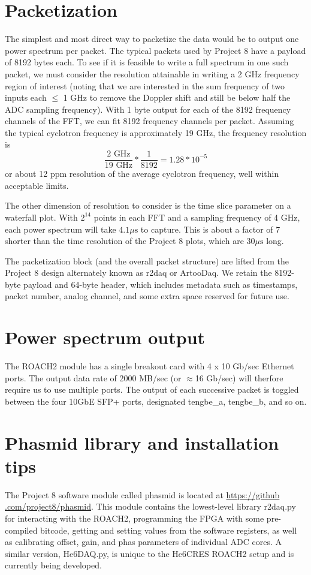 \documentclass[a4paper,10pt]{article}
\begin{document}
\section{Packetization}
The simplest and most direct way to packetize the data would be to output one power spectrum per packet. The typical packets used by Project 8 have a payload of 8192 bytes each. To see if it is feasible to write a full spectrum in one such packet, we must consider the resolution attainable in writing a 2 GHz frequency region of interest (noting that we are interested in the sum frequency of two inputs each $\leq$ 1 GHz to remove the Doppler shift and still be below half the ADC sampling frequency). With 1 byte output for each of the 8192 frequency channels of the FFT, we can fit 8192 frequency channels per packet. Assuming the typical cyclotron frequency is approximately 19 GHz, the frequency resolution is 
\begin{equation}
\frac{2 \text{ GHz}}{19 \text{ GHz}}*\frac{1}{8192} =   1.28*10^{-5}
\end{equation}
or about 12 ppm resolution of the average cyclotron frequency, well within acceptable limits. 

The other dimension of resolution to consider is the time slice parameter on a waterfall plot. With $2^{14}$ points in each FFT and a sampling frequency of 4 GHz, each power spectrum will take $4.1 \mu\text{s}$ to capture. This is about a factor of 7 shorter than the time resolution of the Project 8 plots, which are $30 \mu \text{s}$ long.

The packetization block (and the overall packet structure) are lifted from the Project 8 design alternately known as r2daq or ArtooDaq. We retain the 8192-byte payload and 64-byte header, which includes metadata such as timestamps, packet number, analog channel, and some extra space reserved for future use.

\section{Power spectrum output}
The ROACH2 module has a single breakout card with 4 x 10 Gb/sec Ethernet ports. The output data rate of 2000 MB/sec (or $\approx$16 Gb/sec) will therfore require us to use multiple ports. The output of each successive packet is toggled between the four 10GbE SFP+ ports, designated tengbe\_a, tengbe\_b, and so on. 

\section{Phasmid library and installation tips}
The Project 8 software module called phasmid is located at \href{https://github.com/project8/phasmid}{https://github .com/project8/phasmid}. This module contains the lowest-level library r2daq.py for interacting with the ROACH2, programming the FPGA with some pre-compiled bitcode, getting and setting values from the software registers, as well as calibrating offset, gain, and phas parameters of individual ADC cores. A similar version, He6DAQ.py, is unique to the He6CRES ROACH2 setup and is currently being developed. 
\end{document}
